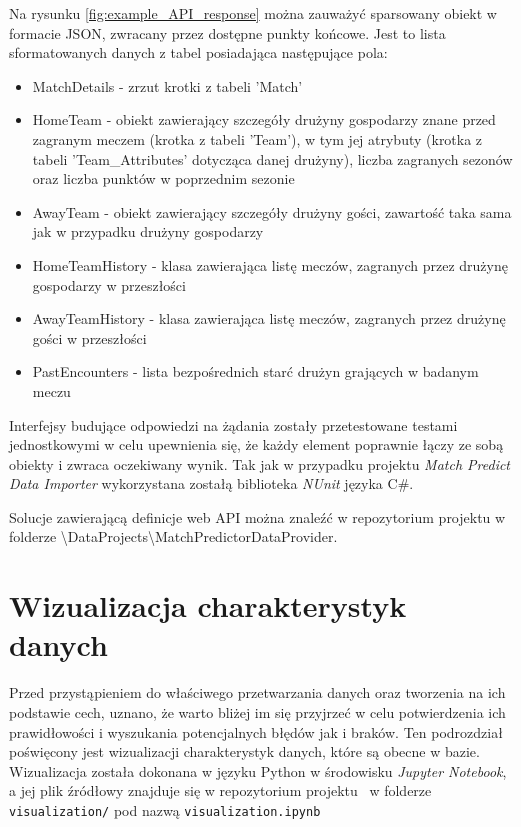     Na rysunku \ref{fig:example_API_response} można zauważyć sparsowany obiekt w formacie JSON, zwracany przez dostępne punkty końcowe. Jest to lista sformatowanych danych z tabel posiadająca następujące pola:
    \begin{itemize}
        \item MatchDetails - zrzut krotki z tabeli 'Match'

        \item HomeTeam - obiekt zawierający szczegóły drużyny gospodarzy znane przed zagranym meczem (krotka z tabeli 'Team'), w tym jej atrybuty (krotka z tabeli 'Team\_Attributes' dotycząca danej drużyny), liczba zagranych sezonów oraz liczba punktów w poprzednim sezonie
        \item AwayTeam - obiekt zawierający szczegóły drużyny gości, zawartość taka sama jak w przypadku drużyny gospodarzy
        \item HomeTeamHistory - klasa zawierająca listę meczów, zagranych przez drużynę gospodarzy w przeszłości
        \item AwayTeamHistory - klasa zawierająca listę meczów, zagranych przez drużynę gości w przeszłości
        \item PastEncounters - lista bezpośrednich starć drużyn grających w badanym meczu
    \end{itemize}
    
    Interfejsy budujące odpowiedzi na żądania zostały przetestowane testami jednostkowymi w celu upewnienia się, że każdy element poprawnie łączy ze sobą obiekty i zwraca oczekiwany wynik. Tak jak w przypadku projektu \textit{Match Predict Data Importer} wykorzystana zostałą biblioteka \textit{NUnit} języka C\#.
    
    Solucje zawierającą definicje web API można znaleźć w repozytorium projektu \cite{repo} w folderze \textbackslash DataProjects\textbackslash MatchPredictorDataProvider.
    
    \section{Wizualizacja charakterystyk danych}
    \noindent Przed przystąpieniem do właściwego przetwarzania danych oraz tworzenia na ich podstawie cech, uznano, że warto bliżej im się przyjrzeć w celu potwierdzenia ich prawidłowości i wyszukania potencjalnych błędów jak i braków. Ten podrozdział poświęcony jest wizualizacji charakterystyk danych, które są obecne w bazie. Wizualizacja została dokonana w języku Python w środowisku \emph{Jupyter Notebook}, a jej plik źródłowy znajduje się w repozytorium projektu~\cite{repo} w folderze \texttt{visualization/} pod nazwą \texttt{visualization.ipynb}
    
